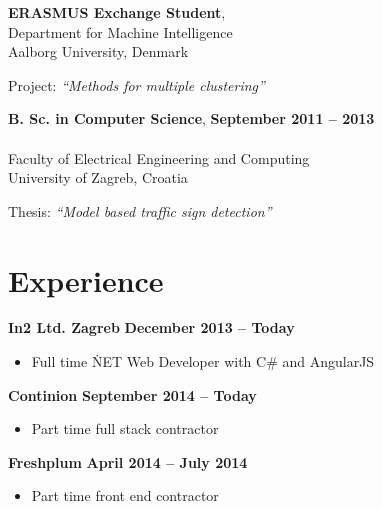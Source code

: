 \documentclass[margin,line]{resume}
\begin{document}
\begin{resume}
    \textbf{ERASMUS Exchange Student}, \\
    Department for Machine Intelligence \\
    Aalborg University, Denmark
    \vspace{1mm}%
    \begin{list2}
        \item Project: \textsl{``Methods for multiple clustering''} 
    \end{list2}


    \textbf{B. Sc. in Computer Science}, \hfill \textbf{ September 2011 -- 2013 }\vspace{-3mm}\\\vspace{-1mm}%
    \\Faculty of Electrical Engineering and Computing
    \\University of Zagreb, Croatia \vspace{1mm}%
    \textsl{} 
    \begin{list2}
        \item Thesis: \textsl{``Model based traffic sign detection''} 
    \end{list2}

    \section{\mysidestyle Experience} 

    \textbf{In2 Ltd. Zagreb} \vspace{1mm} \hfill \textbf{ December 2013 -- Today }
    \begin{itemize}
      \item Full time \.NET Web Developer with C\# and AngularJS
            \vspace{-1mm}
    \end{itemize}

    \textbf{Continion} \vspace{1mm} \hfill \textbf{ September 2014 -- Today }
    \begin{itemize}
      \item Part time full stack contractor
            \vspace{-1mm}
    \end{itemize}

    \textbf{Freshplum} \vspace{1mm} \hfill \textbf{ April 2014 -- July 2014 }
    \begin{itemize}
      \item Part time front end contractor
            \vspace{-1mm}
    \end{itemize}


\end{resume}
\end{document}
